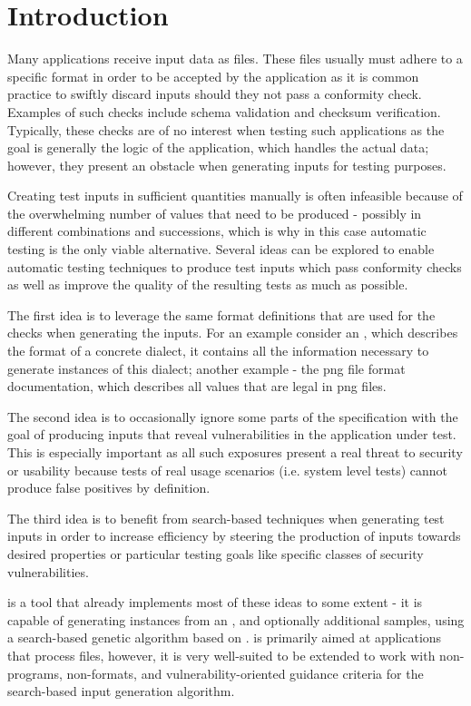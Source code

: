 \section{Introduction}
Many applications receive input data as files. These files usually must adhere to a specific format in order
to be accepted by the application as it is common practice to swiftly discard inputs should they not pass a
conformity check. Examples of such checks include schema validation and checksum verification. Typically, these
checks are of no interest when testing such applications as the goal is generally the logic of the
application, which handles the actual data; however, they present an obstacle when generating inputs for
testing purposes.

Creating test inputs in sufficient quantities manually is often infeasible because of the overwhelming number
of values that need to be produced - possibly in different combinations and successions, which is why in this
case automatic testing is the only viable alternative. Several ideas can be explored to enable automatic
testing techniques to produce test inputs which pass conformity checks as well as improve the quality of the
resulting tests as much as possible.

The first idea is to leverage the same format definitions that are used for the checks when generating the
inputs. For an example consider an \xsd, which describes the format of a concrete \xml dialect, it contains all
the information necessary to generate instances of this dialect; another example - the png file format
documentation, which describes all values that are legal in png files.

The second idea is to occasionally ignore some parts of the specification with the goal of producing inputs
that reveal vulnerabilities in the application under test. This is especially important as all such exposures
present a real threat to security or usability because tests of real usage scenarios (i.e. system level tests)
cannot produce false positives by definition.

The third idea is to benefit from search-based techniques when generating test inputs in order to increase
efficiency by steering the production of inputs towards desired properties or particular testing goals like
specific classes of security vulnerabilities.

\xmlmate{}\cite{Havrikov:2014:XEX:2635868.2661666} is a tool that already implements most of these ideas to
some extent - it is capable of generating \xml instances from an \xsd{}, and optionally additional \xml
samples, using a search-based genetic algorithm based on \evosuite{}\cite{fraser2013whole}. \xmlmate is
primarily aimed at \java applications that process \xml files, however, it is very well-suited to be extended
to work with non-\java programs, non-\xml formats, and vulnerability-oriented guidance criteria for the
search-based input generation algorithm.

